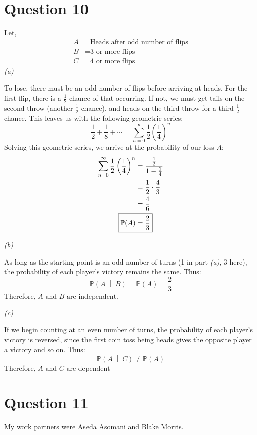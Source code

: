 \documentclass[titlepage, 12pt, leqno]{article}
\begin{document}
\section{Question 10}
Let,
\begin{align*}
    A &= \text{Heads after odd number of flips} \\
    B &= \text{3 or more flips} \\
    C &= \text{4 or more flips}
\end{align*}
\textit{(a)} 

To lose, there must be an odd number of flips before arriving at heads. For the first flip, there is a $\frac{1}{2}$ chance of that occurring. If not, we must get tails on the second throw (another $\frac{1}{2}$ chance), and heads on the third throw for a third $\frac{1}{2}$ chance. This leaves us with the following geometric series:
\[
\frac{1}{2} + \frac{1}{8} + \cdots = \sum_{n=0}^{\infty}\frac{1}{2} \left(\frac{1}{4}\right)^n
\]
Solving this geometric series, we arrive at the probability of our loss $A$:
\begin{align*}
    \sum_{n=0}^{\infty}\frac{1}{2} \left(\frac{1}{4}\right)^n &= \frac{\frac{1}{2} }{1 - \frac{1}{4}} \\
                                                              &= \frac{1}{2} \cdot \frac{4}{3} \\
                                                              &= \frac{4}{6} \\
    \Aboxed{\mathbb{P}(A) &= \frac{2}{3}} 
\end{align*}



\textit{(b)} 

As long as the starting point is an odd number of turns (1 in part \textit{(a)}, 3 here), the probability of each player's victory remains the same. Thus:
\[
    \mathbb{P}\left(A \;\middle|\; B\right) = \mathbb{P}(A) = \frac{2}{3} 
\]
Therefore, $\boxed{A \text{ and } B \text{ are independent.}}$ 

\textit{(c)} 

If we begin counting at an even number of turns, the probability of each player's victory is reversed, since the first coin toss being heads gives the opposite player a victory and so on. Thus: 
\[
    \mathbb{P}\left(A \;\middle|\; C\right) \ne \mathbb{P}(A)
\]
Therefore, $\boxed{A \text{ and } C\text{ are dependent}}$

\pagebreak
\section{Question 11}
My work partners were Aseda Asomani and Blake Morris.
\end{document}
